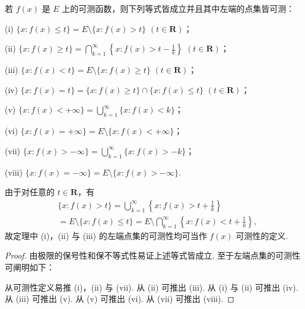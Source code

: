 \documentclass[../../main.tex]{subfiles}
\begin{document}
\begin{theorem}\label{theorem:定理3.2}
若 \(f(x)\) 是 \(E\) 上的可测函数，则下列等式皆成立并且其中左端的点集皆可测：

(i) \(\{x: f(x) \leqslant t\} = E \setminus \{x: f(x) > t\}\) \((t \in \mathbf{R})\)；

(ii) \(\{x: f(x) \geqslant t\} = \bigcap_{k = 1}^{\infty}\left\{x: f(x) > t - \frac{1}{k}\right\}\) \((t \in \mathbf{R})\)；

(iii) \(\{x: f(x) < t\} = E \setminus \{x: f(x) \geqslant t\}\) \((t \in \mathbf{R})\)；

(iv) \(\{x: f(x) = t\} = \{x: f(x) \geqslant t\} \cap \{x: f(x) \leqslant t\}\) \((t \in \mathbf{R})\)；

(v) \(\{x: f(x) < +\infty\} = \bigcup_{k = 1}^{\infty}\{x: f(x) < k\}\)；

(vi) \(\{x: f(x) = +\infty\} = E \setminus \{x: f(x) < +\infty\}\)；

(vii) \(\{x: f(x) > -\infty\} = \bigcup_{k = 1}^{\infty}\{x: f(x) > -k\}\)；

(viii) \(\{x: f(x) = -\infty\} = E \setminus \{x: f(x) > -\infty\}\).
\end{theorem}
\begin{remark}
由于对任意的 \(t \in \mathbf{R}\)，有
\begin{align*}
&\{x: f(x) > t\} = \bigcup_{k = 1}^{\infty}\left\{x: f(x) > t + \frac{1}{k}\right\}\\
&= E \setminus \{x: f(x) \leqslant t\} = E \setminus \bigcap_{k = 1}^{\infty}\left\{x: f(x) < t + \frac{1}{k}\right\},
\end{align*}
故定理中 (i)，(ii) 与 (iii) 的左端点集的可测性均可当作 \(f(x)\) 可测性的定义. 
\end{remark}
\begin{proof}
由极限的保号性和保不等式性易证上述等式皆成立. 至于左端点集的可测性可阐明如下：

从可测性定义易推 (i)，(ii) 与 (vii). 从 (ii) 可推出 (iii). 从 (i) 与 (ii) 可推出 (iv). 从 (iii) 可推出 (v). 从 (v) 可推出 (vi). 从 (vii) 可推出 (viii). 
\end{proof}
\end{document}
